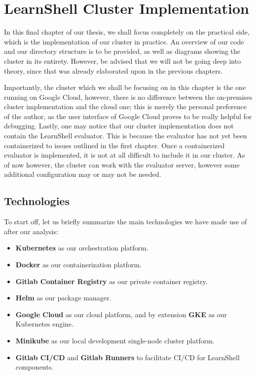 \documentclass[thesis=B,english]{FITthesis}[2019/12/23]
\begin{document}
\chapter{LearnShell Cluster Implementation}

In this final chapter of our thesis, we shall focus completely on the practical side, which is the implementation of our cluster in practice. An overview of our code and our directory structure is to be provided, as well as diagrams showing the cluster in its entirety. However, be advised that we will not be going deep into theory, since that was already elaborated upon in the previous chapters.

Importantly, the cluster which we shall be focusing on in this chapter is the one running on Google Cloud, however, there is no difference between the on-premises cluster implementation and the cloud one; this is merely the personal preference of the author, as the user interface of Google Cloud proves to be really helpful for debugging. Lastly, one may notice that our cluster implementation does not contain the LearnShell evaluator. This is because the evaluator has not yet been containerized to issues outlined in the first chapter. Once a containerized evaluator is implemented, it is not at all difficult to include it in our cluster. As of now however, the cluster can work with the evaluator server, however some additional configuration may or may not be needed.

\section{Technologies}

To start off, let us briefly summarize the main technologies we have made use of after our analysis:

\begin{itemize}
  \setlength\itemsep{0em}
  \item \textbf{Kubernetes} as our orchestration platform.
  \item \textbf{Docker} as our containerization platform.
  \item \textbf{Gitlab Container Registry} as our private container registry.
  \item \textbf{Helm} as our package manager.
  \item \textbf{Google Cloud} as our cloud platform, and by extension \textbf{GKE} as our Kubernetes engine.
  \item \textbf{Minikube} as our local development single-node cluster platform.
  \item \textbf{Gitlab CI/CD} and \textbf{Gitlab Runners} to facilitate CI/CD for LearnShell components.
\end{itemize}
\end{document}
